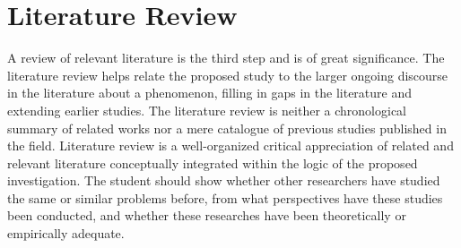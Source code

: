\section{Literature Review} \label{lit-review}

A review of relevant literature is the third step and is of great significance.
The literature review helps relate the proposed study to the larger ongoing
discourse in the literature about a phenomenon, filling in gaps in the
literature and extending earlier studies. The literature review is neither a
chronological summary of related works nor a mere catalogue of previous studies
published in the field. Literature review is a well-organized critical
appreciation of related and relevant literature conceptually integrated within
the logic of the proposed investigation. The student should show whether other
researchers have studied the same or similar problems before, from what
perspectives have these studies been conducted, and whether these researches
have been theoretically or empirically adequate.
